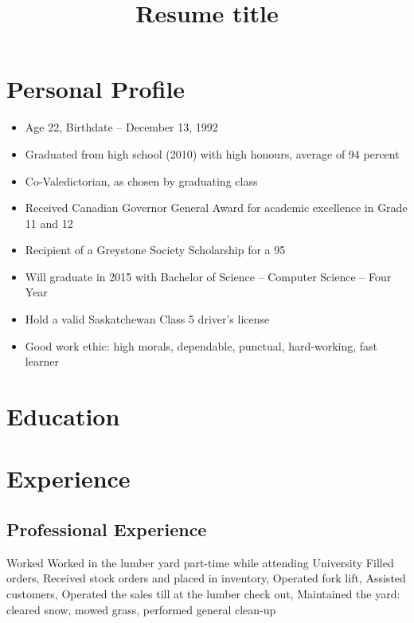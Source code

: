 \documentclass[11pt,letterpaper,sans]{moderncv}        %
\title{Resume title}                               %
\begin{document}
\makecvtitle

\section{Personal Profile}
\cvitem{}
{
  \begin{itemize}
    \item Age 22, Birthdate -- December 13, 1992
    \item Graduated from high school (2010) with high honours, average of 94 percent
    \item Co-Valedictorian, as chosen by graduating class
    \item Received Canadian Governor General Award for academic excellence in Grade 11 and 12
    \item Recipient of a Greystone Society Scholarship for a 95%
    \item Will graduate in 2015 with Bachelor of Science -- Computer Science -- Four Year
    \item Hold a valid Saskatchewan Class 5 driver's license
    \item Good work ethic: high morals, dependable, punctual, hard-working, fast learner
  \end{itemize}
}

\section{Education}


\section{Experience}
\subsection{Professional Experience}
{
  Worked Worked in the lumber yard part-time while attending University
  \newline{}
  Filled orders, Received stock orders and placed in inventory, Operated fork lift, Assisted customers, Operated the sales till at the lumber check out, Maintained the yard: cleared snow, mowed grass, performed general clean-up
}
\end{document}
